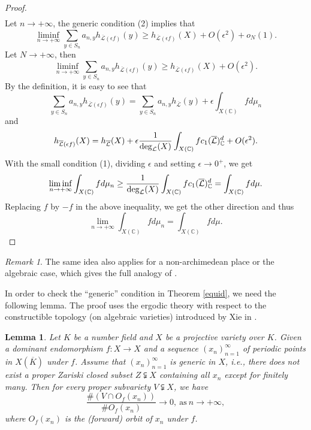 \documentclass[12pt]{amsart}
\theoremstyle{plain}
\newtheorem{Lem}[Thm]{Lemma}
\theoremstyle{remark}
\newtheorem{Rem}[Thm]{Remark}
\theoremstyle{definition}
\def\C{\mathbb C}
\begin{document}
\begin{proof}
\begin{align*}
	\end{align*}Let $n\to+\infty$, the generic condition (2) implies that $$\liminf_{n\to+\infty}\sum_{y\in S_n}a_{n,y}h_{\overline{\mathcal{L}}(\epsilon f)}(y)\geq h_{\overline{\mathcal{L}}(\epsilon f)}(X)+O(\epsilon^2)+o_N(1).$$Let $N\to+\infty$, then $$\liminf_{n\to+\infty}\sum_{y\in S_n}a_{n,y}h_{\overline{\mathcal{L}}(\epsilon f)}(y)\geq h_{\overline{\mathcal{L}}(\epsilon f)}(X)+O(\epsilon^2).$$ By the definition, it is easy to see that $$\sum_{y\in S_n}a_{n,y}h_{\overline{\mathcal{L}}(\epsilon f)}(y)=\sum_{y\in S_n}a_{n,y}h_{\overline{\mathcal{L}}}(y)+\epsilon\int_{X(\C)}fd\mu_n$$ and $$h_{\overline{\mathcal{L}}(\epsilon f)}(X)=h_{\overline{\mathcal{L}}}(X)+\epsilon\frac{1}{{\rm deg}_{\mathcal{L}}(X)}\int_{X(\C)}fc_1(\overline{\mathcal{L}})_\C^d+O(\epsilon^2).$$ With the small condition (1), dividing $\epsilon$ and setting $\epsilon\to0^+$, we get $$\liminf_{n\to+\infty}\int_{X(\C)}fd\mu_n\geq\frac{1}{{\rm deg}_{\mathcal{L}}(X)}\int_{X(\C)}fc_1(\overline{\mathcal{L}})_\C^d=\int_{X(\C)}fd\mu.$$Replacing $f$ by $-f$ in the above inequality, we get the other direction and thus$$\lim_{n\to+\infty}\int_{X(\C)}fd\mu_n=\int_{X(\C)}fd\mu.$$
\end{proof}
\begin{Rem}
The same idea also applies for a non-archimedean place or the algebraic case, which gives the full analogy of \cite[Theorem 3.1 and 3.2]{Yuan2008}.
\end{Rem}
In order to check the “generic” condition in Theorem \ref{equid}, we need the following lemma. The proof uses the ergodic theory with respect to the constructible topology (on algebraic varieties) introduced by Xie in \cite{Xie2023}. 
\begin{Lem}\label{pergene}
	Let $K$ be a number field and $X$ be a projective variety over $K$. Given a dominant endomorphism $f:X\to X$ and a sequence $(x_n)_{n=1}^\infty$ of periodic points in $X(\overline{K})$ under $f$. Assume that $(x_n)_{n=1}^\infty$ is generic in $X$, i.e., there does not exist a proper Zariski closed subset $Z\subsetneqq X$ containing all $x_n$ except for finitely many. Then for every proper subvariety $V\subsetneqq X$, we have \begin{equation}\label{2.4}
		\frac{\#(V\cap O_f(x_n))}{\# O_f(x_n)}\to0,\ \text{as}\ n\to+\infty,
	\end{equation}where $O_f(x_n)$ is the (forward) orbit of $x_n$ under $f$.
\end{Lem}
\end{document}
